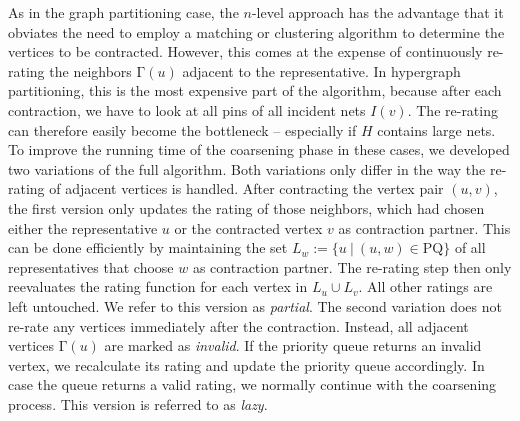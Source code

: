 \documentclass[runningheads,a4paper]{llncs}
\begin{document}
As in the graph partitioning case, the $n$-level approach has the advantage that it obviates the need to employ a matching or clustering
algorithm to determine the vertices to be contracted. However, this comes at the expense of continuously re-rating the neighbors $\mathrm{\Gamma}(u)$ adjacent to the representative. In hypergraph partitioning, this is the most expensive part of the algorithm, because after each contraction, we have to look at all pins of all incident nets $I(v)$. The re-rating can therefore easily become the bottleneck -- especially if $H$ contains large nets. To improve the running time of the coarsening phase in these cases, we developed two variations of the full algorithm. 
Both variations only differ in the 
way the re-rating of adjacent vertices is handled. After contracting the vertex pair $(u,v)$, the first version only updates the rating of those 
neighbors, which had chosen either the representative $u$ or the contracted vertex $v$ as contraction partner. This can be done efficiently by 
maintaining the set $L_w := \{u~|~ (u,w) \in \text{PQ}\}$ of all representatives that choose $w$ as contraction partner. The re-rating step then only reevaluates the rating function 
for each vertex in $L_u \cup L_v$. All other ratings are left untouched. We refer to this version as \emph{partial}.
The second variation does not re-rate any vertices immediately after the contraction. Instead, all adjacent vertices $\mathrm{\Gamma}(u)$ are marked as \emph{invalid}. If the priority queue returns an invalid vertex, we recalculate its rating and update the priority queue accordingly. In case the queue returns a valid rating, we normally continue with the coarsening process.
This version is referred to as \emph{lazy}.
\end{document}
